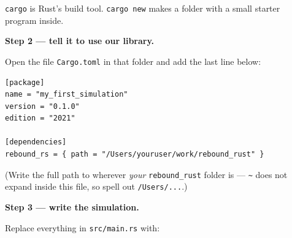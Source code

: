\documentclass[11pt]{article}
\begin{document}
\texttt{cargo} is Rust's build tool. \texttt{cargo new} makes a folder with a small starter program inside.

\textbf{Step 2 --- tell it to use our library.}

Open the file \texttt{Cargo.toml} in that folder and add the last line below:

\begin{lstlisting}
[package]
name = "my_first_simulation"
version = "0.1.0"
edition = "2021"

[dependencies]
rebound_rs = { path = "/Users/youruser/work/rebound_rust" }
\end{lstlisting}

(Write the full path to wherever \emph{your} \texttt{rebound\_rust} folder is --- \texttt{\textasciitilde{}} does not expand inside this file, so spell out \texttt{/Users/...}.)

\textbf{Step 3 --- write the simulation.}

Replace everything in \texttt{src/main.rs} with:
\end{document}
